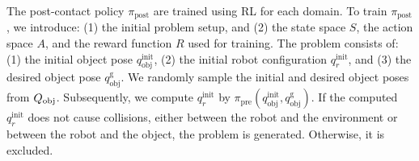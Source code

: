 



The post-contact policy $\pi_\text{post}$ are trained using RL for each domain. To train \( \pi_\text{post} \), we introduce: (1) the initial problem setup, and (2) the state space \( S \), the action space \( A \), and the reward function \( R \) used for training. The problem consists of: (1) the initial object pose \( q^\text{init}_\text{obj} \), (2) the initial robot configuration \( q^\text{init}_r \), and (3) the desired object pose \( q^\text{g}_\text{obj} \). We randomly sample the initial and desired object poses from \( Q_\text{obj} \). Subsequently, we compute \( q^\text{init}_r \) by \( \pi_\text{pre}(q^\text{init}_\text{obj},q^\text{g}_\text{obj}) \). If the computed \( q^\text{init}_r \) does not cause collisions, either between the robot and the environment or between the robot and the object, the problem is generated. Otherwise, it is excluded.

